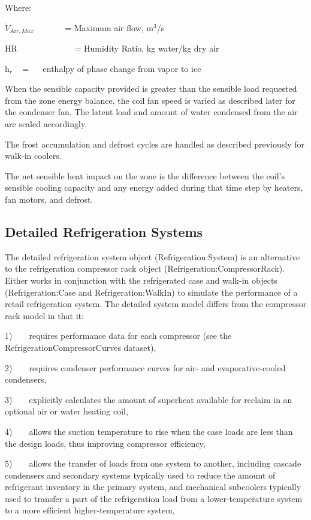 Where:

\({\dot V_{Air,Max}}\) ~~~~~~ = Maximum air flow, m\(^{3}\)/s

HR~~~~~~~~~~~~~ = Humidity Ratio, kg water/kg dry air

h\(_{r}\) ~ = ~~ enthalpy of phase change from vapor to ice

When the sensible capacity provided is greater than the sensible load requested from the zone energy balance, the coil fan speed is varied as described later for the condenser fan. The latent load and amount of water condensed from the air are scaled accordingly.

The frost accumulation and defrost cycles are handled as described previously for walk-in coolers.

The net sensible heat impact on the zone is the difference between the coil's sensible cooling capacity and any energy added during that time step by heaters, fan motors, and defrost.

\subsection{Detailed Refrigeration Systems}\label{detailed-refrigeration-systems}

The detailed refrigeration system object (Refrigeration:System) is an alternative to the refrigeration compressor rack object (Refrigeration:CompressorRack). Either works in conjunction with the refrigerated case and walk-in objects (Refrigeration:Case and Refrigeration:WalkIn) to simulate the performance of a retail refrigeration system. The detailed system model differs from the compressor rack model in that it:

1)~~~~requires performance data for each compressor (see the RefrigerationCompressorCurves dataset),

2)~~~~requires condenser performance curves for air- and evaporative-cooled condensers,

3)~~~~explicitly calculates the amount of superheat available for reclaim in an optional air or water heating coil,

4)~~~~allows the suction temperature to rise when the case loads are less than the design loads, thus improving compressor efficiency,

5)~~~~allows the transfer of loads from one system to another, including cascade condensers and secondary systems typically used to reduce the amount of refrigerant inventory in the primary system, and mechanical subcoolers typically used to transfer a part of the refrigeration load from a lower-temperature system to a more efficient higher-temperature system,

